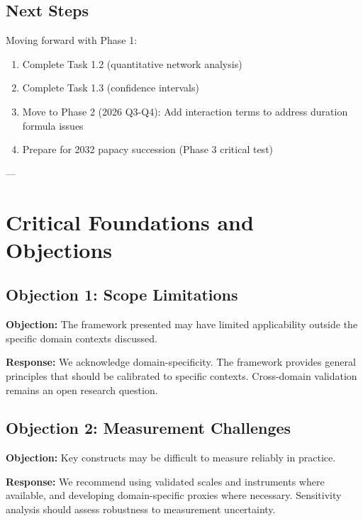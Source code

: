 \subsection{Next Steps}

Moving forward with Phase 1:
\begin{enumerate}
    \item Complete Task 1.2 (quantitative network analysis)
    \item Complete Task 1.3 (confidence intervals)
    \item Move to Phase 2 (2026 Q3-Q4): Add interaction terms to address duration formula issues
    \item Prepare for 2032 papacy succession (Phase 3 critical test)
\end{enumerate}

---


\section{Critical Foundations and Objections}
\label{sec:pap-foundations}

\subsection{Objection 1: Scope Limitations}

\textbf{Objection:} The framework presented may have limited applicability
outside the specific domain contexts discussed.

\textbf{Response:} We acknowledge domain-specificity. The framework provides
general principles that should be calibrated to specific contexts. Cross-domain
validation remains an open research question.

\subsection{Objection 2: Measurement Challenges}

\textbf{Objection:} Key constructs may be difficult to measure reliably in
practice.

\textbf{Response:} We recommend using validated scales and instruments where
available, and developing domain-specific proxies where necessary. Sensitivity
analysis should assess robustness to measurement uncertainty.




